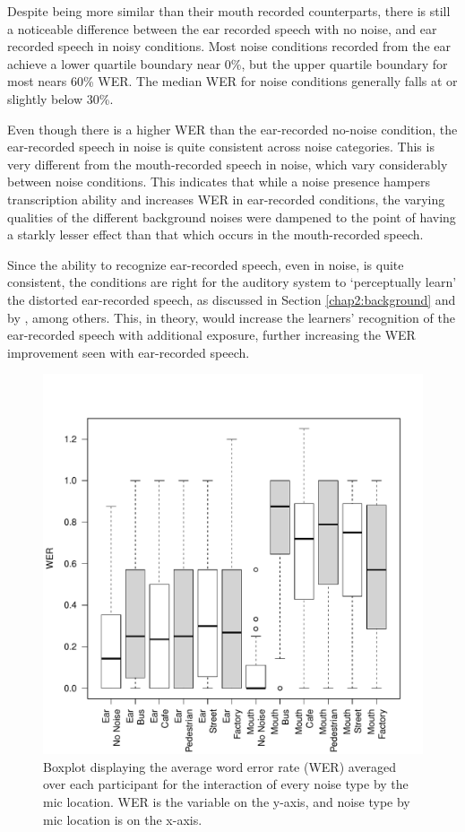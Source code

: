 \documentclass[dissertation,copyright]{uathesis}
\makeatletter
\def\maxwidth{ %
  \ifdim\Gin@nat@width>\linewidth
    \linewidth
  \else
    \Gin@nat@width
  \fi
}
\makeatother
\begin{document}
Despite being more similar than their mouth recorded counterparts, there is still a noticeable difference between the ear recorded speech with no noise, and ear recorded speech in noisy conditions.  Most noise conditions recorded from the ear achieve a lower quartile boundary near 0\%, but the upper quartile boundary for most nears 60\% WER.  The median WER for noise conditions generally falls at or slightly below 30\%. 

Even though there is a higher WER than the ear-recorded no-noise condition, the ear-recorded speech in noise is quite consistent across noise categories.  This is very different from the mouth-recorded speech in noise, which vary considerably between noise conditions.  This indicates that while a noise presence hampers transcription ability and increases WER in ear-recorded conditions, the varying qualities of the different background noises were dampened to the point of having a starkly lesser effect than that which occurs in the mouth-recorded speech.

Since the ability to recognize ear-recorded speech, even in noise, is quite consistent, the conditions are right for the auditory system to `perceptually learn' the distorted ear-recorded speech, as discussed in Section \ref{chap2:background} and by \cite{mattys:12}, among others.  This, in theory, would increase the learners' recognition of the ear-recorded speech with additional exposure, further increasing the WER improvement seen with ear-recorded speech.


\begin{figure}[h!]

\includegraphics[width=\maxwidth]{figure/boxplot_noiseXmic2-1} 

\caption{Boxplot displaying the average word error rate (WER) averaged over each participant for the interaction of every noise type by the mic location. WER is the variable on the y-axis, and noise type by mic location is on the x-axis.}
\label{fig:noiseXmic2}
\end{figure}
\end{document}
